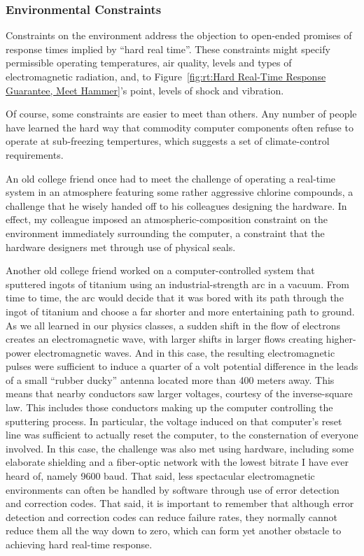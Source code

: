 \subsubsection{Environmental Constraints}
\label{sec:rt:Environmental Constraints}

Constraints on the environment address the objection to open-ended
promises of response times implied by ``hard real time''.
These constraints might specify permissible operating temperatures,
air quality, levels and types of electromagnetic radiation, and, to
Figure~\ref{fig:rt:Hard Real-Time Response Guarantee, Meet Hammer}'s
point, levels of shock and vibration.

Of course, some constraints are easier to meet than others.
Any number of people have learned the hard way that
commodity computer components often refuse to operate at sub-freezing
tempertures, which suggests a set of climate-control requirements.

An old college friend once had to meet the challenge of operating
a real-time system in an atmosphere featuring some rather aggressive
chlorine compounds, a challenge that he wisely handed off to his
colleagues designing the hardware.
In effect, my colleague imposed an atmospheric-composition constraint
on the environment immediately surrounding the computer, a constraint
that the hardware designers met through use of physical seals.

Another old college friend worked on a computer-controlled system
that sputtered ingots of titanium using an industrial-strength arc
in a vacuum.
From time to time, the arc would decide that it was bored with its path
through the ingot of titanium and choose a far shorter and more
entertaining path to ground.
As we all learned in our physics classes, a sudden shift in the flow of
electrons creates an electromagnetic wave, with larger shifts in larger
flows creating higher-power electromagnetic waves.
And in this case, the resulting electromagnetic pulses were sufficient
to induce a quarter of a volt potential difference in the leads of
a small ``rubber ducky'' antenna located more than 400 meters away.
This means that nearby conductors saw larger voltages, courtesy of the
inverse-square law.
This includes those
conductors making up the computer controlling the sputtering process.
In particular, the voltage induced on that computer's reset line was
sufficient to actually reset the computer, to the consternation of everyone
involved.
In this case, the challenge was also met using hardware, including some
elaborate shielding and a fiber-optic network with the lowest bitrate
I have ever heard of, namely 9600 baud.
That said, less spectacular electromagnetic environments can often be
handled by software through use of error detection and correction codes.
That said, it is important to remember that although error detection and
correction codes can reduce failure rates, they normally cannot reduce
them all the way down to zero, which can form yet another obstacle
to achieving hard real-time response.

